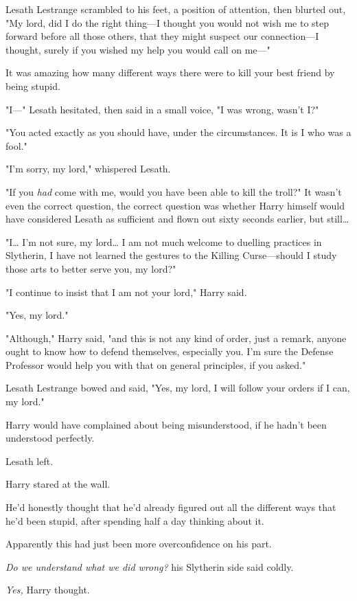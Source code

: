 Lesath Lestrange scrambled to his feet, a position of attention, then blurted
out, "My lord, did I do the right thing---I thought you would not wish me to
step forward before all those others, that they might suspect our
connection---I thought, surely if you wished my help you would call on me---"

It was amazing how many different ways there were to kill your best friend by
being stupid.

"I---" Lesath hesitated, then said in a small voice, "I was wrong, wasn't I?"

"You acted exactly as you should have, under the circumstances. It is I who was
a fool."

"I'm sorry, my lord," whispered Lesath.

"If you \emph{had} come with me, would you have been able to kill the troll?"
It wasn't even the correct question, the correct question was whether Harry
himself would have considered Lesath as sufficient and flown out sixty seconds
earlier, but still{\ldots}

"I{\ldots} I'm not sure, my lord{\ldots} I am not much welcome to duelling
practices in Slytherin, I have not learned the gestures to the Killing
Curse---should I study those arts to better serve you, my lord?"

"I continue to insist that I am not your lord," Harry said.

"Yes, my lord."

"Although," Harry said, "and this is not any kind of order, just a remark,
anyone ought to know how to defend themselves, especially you. I'm sure the
Defense Professor would help you with that on general principles, if you asked."

Lesath Lestrange bowed and said, "Yes, my lord, I will follow your orders if I
can, my lord."

Harry would have complained about being misunderstood, if he hadn't been
understood perfectly.

Lesath left.

Harry stared at the wall.

He'd honestly thought that he'd already figured out all the different ways that
he'd been stupid, after spending half a day thinking about it.

Apparently this had just been more overconfidence on his part.

\emph{Do we understand what we did wrong?} his Slytherin side said coldly.

\emph{Yes,} Harry thought.

